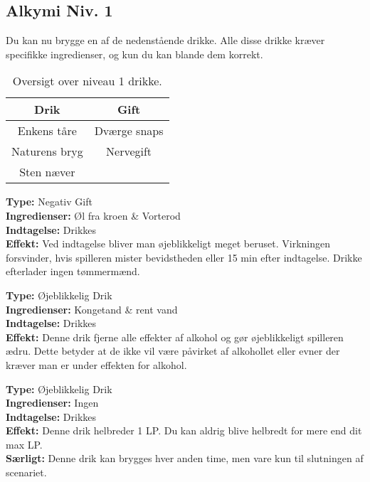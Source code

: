 \subsection*{Alkymi Niv. 1}
Du kan nu brygge en af de nedenstående drikke. Alle disse drikke kræver specifikke ingredienser, og kun du kan blande dem korrekt.\\

\begin{table}[H]
    \centering
    \begin{tabular}{|c|c|}
        \rowcolor{cerulean!80}\hline
        Drik & Gift \\\hline
        Enkens tåre &  Dværge snaps \\\hline
        Naturens bryg & Nervegift \\\hline
        Sten næver &  \\\hline
    \end{tabular}
    \caption{Oversigt over niveau 1 drikke.}
\end{table}

\begin{gift*}
\textbf{Type:} Negativ Gift\\
\textbf{Ingredienser:} Øl fra kroen \& Vorterod\\
\textbf{Indtagelse:} Drikkes\\
\textbf{Effekt:} Ved indtagelse bliver man øjeblikkeligt meget beruset. Virkningen forsvinder, hvis spilleren mister bevidstheden eller 15 min efter indtagelse. Drikke efterlader ingen tømmermænd.\\
\end{gift*}

\begin{drik*}
\textbf{Type:} Øjeblikkelig Drik\\
\textbf{Ingredienser:} Kongetand \& rent vand\\
\textbf{Indtagelse:} Drikkes\\
\textbf{Effekt:} Denne drik fjerne alle effekter af alkohol og gør øjeblikkeligt spilleren ædru. Dette betyder at de ikke vil være påvirket af alkohollet eller evner der kræver man er under effekten for alkohol.\\
\end{drik*}

\begin{drik*}
    \textbf{Type:} Øjeblikkelig Drik\\
    \textbf{Ingredienser:} Ingen\\
    \textbf{Indtagelse:} Drikkes\\
    \textbf{Effekt:} Denne drik helbreder 1 LP. Du kan aldrig blive helbredt for mere end dit max LP.\\
    \textbf{Særligt:} Denne drik kan brygges hver anden time, men vare kun til slutningen af scenariet.
\end{drik*}

